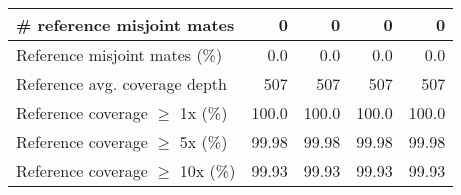 \documentclass[12pt,a4paper]{article}
\begin{document}
\begin{table}[ht]
\begin{center}
\begin{tabular}{|l*{4}{|r}|}
\# reference misjoint mates & 0 & 0 & 0 & 0 \\ \hline
Reference misjoint mates (\%) & 0.0 & 0.0 & 0.0 & 0.0 \\ \hline
Reference avg. coverage depth & 507 & 507 & 507 & 507 \\ \hline
Reference coverage $\geq$ 1x (\%) & 100.0 & 100.0 & 100.0 & 100.0 \\ \hline
Reference coverage $\geq$ 5x (\%) & 99.98 & 99.98 & 99.98 & 99.98 \\ \hline
Reference coverage $\geq$ 10x (\%) & 99.93 & 99.93 & 99.93 & 99.93 \\ \hline
\end{tabular}
\end{center}
\end{table}
\end{document}
